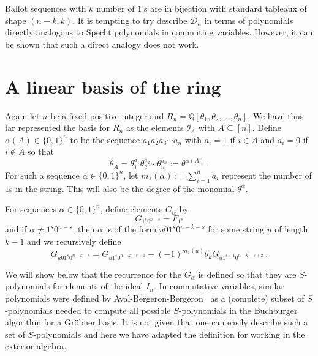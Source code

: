 \documentclass[submission]{FPSAC2023}
\theoremstyle{definition}
\numberwithin{equation}{section}
\begin{document}
Ballot sequences with $k$ number of $1$'s are in bijection with standard tableaux of shape $(n-k,k)$. It is tempting to try describe $\mathcal{D}_{n}$ in terms of polynomials directly analogous to Specht polynomials in commuting variables. However, it can be shown that such a direct analogy does not work.

\section{A linear basis of the ring}\label{sec:linbasis}

Again let $n$ be a fixed positive integer and $R_n = {\mathbb Q}[\theta_1, \theta_2, \ldots, \theta_n]$.
We have thus far represented the basis for
$R_n$ as the elements $\theta_A$ with $A \subseteq [n]$.  Define $\alpha(A) \in \{ 0,1\}^n$ to be
the sequence $a_1 a_2 a_3 \cdots a_n$ with $a_i = 1$ if $i \in A$ and
$a_i = 0$ if $i \notin A$ so that
\[
\theta_A = \theta_1^{a_1} \theta_2^{a_2} \cdots \theta_n^{a_n} := \theta^{\alpha(A)}~.
\]
For such a sequence $\alpha \in \{0,1\}^n$, let $m_1(\alpha) := \sum_{i=1}^n a_i$
represent the number of $1$s in the string.  This will also be the degree of the monomial
$\theta^{\alpha}$.

For sequences $\alpha \in \{ 0, 1 \}^n$, define elements $G_\alpha$ by
\begin{equation}\label{eq:Gdef1}
G_{1^s0^{n-s}} = F_{1^s}
\end{equation}
and if $\alpha \neq 1^s 0^{n-s}$, then $\alpha$ is of the form $u01^s0^{n-k-s}$ for some string $u$
of length $k-1$ and we recursively define
\begin{equation}\label{eq:Gdef2}
G_{u01^s0^{n-k-s}} = G_{u1^s0^{n-k-s+1}} - (-1)^{m_1(u)} \theta_k G_{u1^{s-1}0^{n-k-s+2}}~.
\end{equation}

We will show below that the recurrence for the
$G_\alpha$ is defined so that they are $S$-polynomials \cite{CLO}
for elements of the ideal $I_n$.
In commutative variables, similar polynomials were defined by Aval-Bergeron-Bergeron~\cite{AB,ABB}
as a (complete) subset of $S$-polynomials needed to compute all possible
$S$-polynomials in the Buchburger algorithm for a Gr\"obner basis.
It is not given that one can easily describe such a set of $S$-polynomials and here we have adapted
the definition for working in the exterior algebra.
\end{document}
